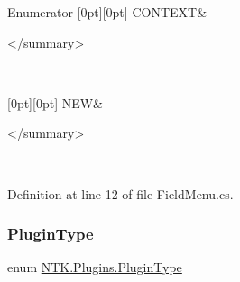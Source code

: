 \begin{DoxyEnumFields}{Enumerator}
[0pt][0pt]{}\mbox{\label{namespace_n_t_k_1_1_plugins_af944b76d225e171a8ed7d3ca5e30667ea03dcdeb793b893c48eda7952aac3c03c}} 
C\+O\+N\+T\+E\+XT&\begin{DoxyVerb}    </summary> \end{DoxyVerb}
 \\
\hline

[0pt][0pt]{}\mbox{\label{namespace_n_t_k_1_1_plugins_af944b76d225e171a8ed7d3ca5e30667ea24d459a81449d7210c8f9a86c2913034}} 
N\+EW&\begin{DoxyVerb}    </summary> \end{DoxyVerb}
 \\
\hline

\end{DoxyEnumFields}


Definition at line 12 of file Field\+Menu.\+cs.

\mbox{\label{namespace_n_t_k_1_1_plugins_a28446e981e24d29d7c9c23b245f6987b}} 
\subsubsection{\texorpdfstring{PluginType}{PluginType}}
{\footnotesize\ttfamily enum \mbox{\hyperlink{namespace_n_t_k_1_1_plugins_a28446e981e24d29d7c9c23b245f6987b}{N\+T\+K.\+Plugins.\+Plugin\+Type}}\hspace{0.3cm}{\ttfamily [strong]}}





